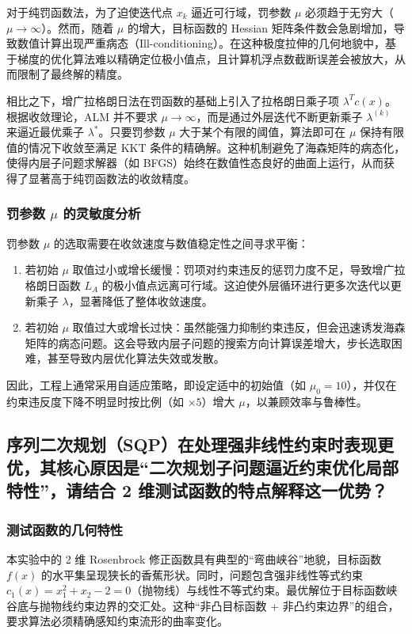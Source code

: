 \documentclass[a4paper,12pt]{article}
\begin{document}
对于纯罚函数法，为了迫使迭代点 $x_k$ 逼近可行域，罚参数 $\mu$ 必须趋于无穷大（$\mu \to \infty$）。然而，随着 $\mu$ 的增大，目标函数的 Hessian 矩阵条件数会急剧增加，导致数值计算出现严重病态（Ill-conditioning）。在这种极度拉伸的几何地貌中，基于梯度的优化算法难以精确定位极小值点，且计算机浮点数截断误差会被放大，从而限制了最终解的精度。

相比之下，增广拉格朗日法在罚函数的基础上引入了拉格朗日乘子项 $\lambda^T c(x)$。根据收敛理论，ALM 并不要求 $\mu \to \infty$，而是通过外层迭代不断更新乘子 $\lambda^{(k)}$ 来逼近最优乘子 $\lambda^*$。只要罚参数 $\mu$ 大于某个有限的阈值，算法即可在 $\mu$ 保持有限值的情况下收敛至满足 KKT 条件的精确解。这种机制避免了海森矩阵的病态化，使得内层子问题求解器（如 BFGS）始终在数值性态良好的曲面上运行，从而获得了显著高于纯罚函数法的收敛精度。

\subsubsection{罚参数 $\mu$ 的灵敏度分析}
罚参数 $\mu$ 的选取需要在收敛速度与数值稳定性之间寻求平衡：
\begin{enumerate}
    \item 若初始 $\mu$ 取值过小或增长缓慢：罚项对约束违反的惩罚力度不足，导致增广拉格朗日函数 $L_A$ 的极小值点远离可行域。这迫使外层循环进行更多次迭代以更新乘子 $\lambda$，显著降低了整体收敛速度。
    \item 若初始 $\mu$ 取值过大或增长过快：虽然能强力抑制约束违反，但会迅速诱发海森矩阵的病态问题。这会导致内层子问题的搜索方向计算误差增大，步长选取困难，甚至导致内层优化算法失效或发散。
\end{enumerate}
因此，工程上通常采用自适应策略，即设定适中的初始值（如 $\mu_0=10$），并仅在约束违反度下降不明显时按比例（如 $\times 5$）增大 $\mu$，以兼顾效率与鲁棒性。

\subsection{序列二次规划（SQP）在处理强非线性约束时表现更优，其核心原因是“二次规划子问题逼近约束优化局部特性”，请结合 2 维测试函数的特点解释这一优势？}

\subsubsection{测试函数的几何特性}
本实验中的 2 维 Rosenbrock 修正函数具有典型的“弯曲峡谷”地貌，目标函数 $f(x)$ 的水平集呈现狭长的香蕉形状。同时，问题包含强非线性等式约束 $c_1(x) = x_1^2 + x_2 - 2 = 0$（抛物线）与线性不等式约束。最优解位于目标函数峡谷底与抛物线约束边界的交汇处。这种“非凸目标函数 + 非凸约束边界”的组合，要求算法必须精确感知约束流形的曲率变化。
\end{document}
